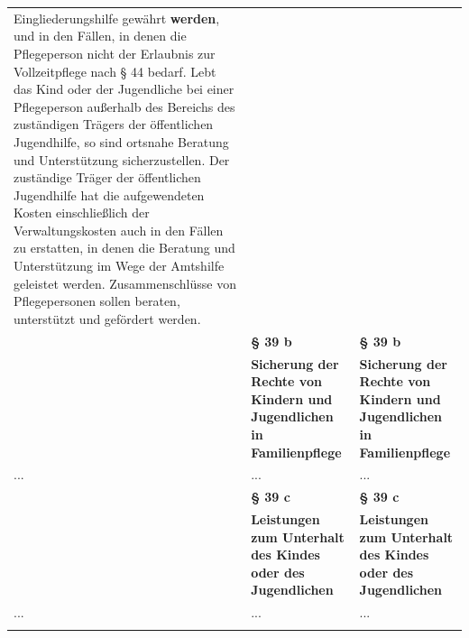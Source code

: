 \documentclass[10pt,a4paper,landscape]{article}
\begin{document}
\begin{longtable}{|L{8.2cm}|L{8.2cm}|L{8.2cm}|}
Eingliederungshilfe  \newline gewährt \textbf{\textcolor{diffgreen}{werden}}\textcolor{diffgreen}{,} und in den Fällen, in  \newline denen die Pflegeperson nicht der Erlaubnis  \newline zur Vollzeitpflege nach \S{} 44 bedarf. Lebt  \newline das Kind oder der Jugendliche bei einer  \newline Pflegeperson außerhalb des Bereichs des  \newline zuständigen Trägers der öffentlichen  \newline Jugendhilfe, so sind ortsnahe Beratung und  \newline Unterstützung sicherzustellen. Der  \newline zuständige Träger der öffentlichen  \newline Jugendhilfe hat die aufgewendeten Kosten  \newline einschließlich der Verwaltungskosten auch  \newline in den Fällen zu erstatten, in denen die  \newline Beratung und Unterstützung im Wege der  \newline Amtshilfe geleistet werden.  \newline Zusammenschlüsse von Pflegepersonen  sollen beraten, unterstützt und gefördert  \newline werden. \\
\hhline{|---|}
 & \textbf{\S{} 39 b} & \textbf{\S{} 39 b} \\
\hhline{|---|}
 & \textbf{Sicherung der Rechte von Kindern und  \newline Jugendlichen in Familienpflege } & \textbf{Sicherung der Rechte von Kindern und  \newline Jugendlichen in Familienpflege } \\
\hhline{|---|}
... & ... & ... \\
\hhline{|---|}
 & \textbf{\S{} 39 c } & \textbf{\S{} 39 c } \\
\hhline{|---|}
 & \textbf{Leistungen zum Unterhalt des Kindes  \newline oder des Jugendlichen } & \textbf{Leistungen zum Unterhalt des Kindes  \newline oder des Jugendlichen } \\
\hhline{|---|}
... & ... & ... \\
\hhline{|---|}

\end{longtable}
\end{document}
